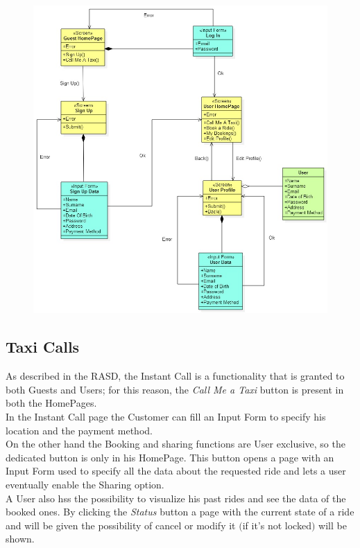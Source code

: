 	\begin{figure}[h!]
		\centering
		\includegraphics[height=0.65\textheight]{UXDiagrams/UXProfile.jpg}
	\end{figure}
	
\newpage
\subsection{Taxi Calls}
As described in the RASD, the Instant Call is a functionality that is granted to both Guests and Users; for this reason, the \textit{Call Me a Taxi} button is present in both the HomePages. \\
In the Instant Call page the Customer can fill an Input Form to specify his location and the payment method.\\
On the other hand the Booking and sharing functions are User exclusive, so the dedicated button is only in his HomePage. This button opens a page with an Input Form used to specify all the data about the requested ride and lets a user eventually enable the Sharing option.\\
A User also hss the possibility to visualize his past rides and see the data of the booked ones. By clicking the \textit{Status} button a page with the current state of a ride and will be given the possibility of cancel or modify it $($if it's not locked$)$ will be shown.

